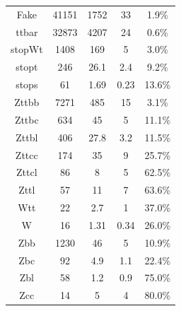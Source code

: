 \begin{table}
\begin{tabular}{|c|c|c|c|c|}
\hline
Fake             &            41151   &        1752                  &            33              &        1.9\%  \\
ttbar             &           32873   &         4207                  &            24              &        0.6\%  \\
stopWt             &           1408   &          169                  &            5              &        3.0\%  \\
stopt             &             246   &         26.1                  &            2.4              &        9.2\%  \\
stops             &              61   &         1.69                  &            0.23              &        13.6\%  \\
Zttbb             &            7271   &         485                  &            15              &        3.1\%  \\
Zttbc             &             634   &         45                  &            5              &        11.1\%  \\
Zttbl             &             406   &         27.8                  &            3.2              &        11.5\%  \\
Zttcc             &             174   &         35                  &            9              &        25.7\%  \\
Zttcl             &              86   &         8                  &            5              &        62.5\%  \\
Zttl             &               57   &        11                  &            7              &        63.6\%  \\
Wtt             &                22   &       2.7                  &            1              &        37.0\%  \\
W             &                  16   &     1.31                  &            0.34              &        26.0\%  \\
Zbb             &              1230   &       46                  &            5              &        10.9\%  \\
Zbc             &                92   &       4.9                  &            1.1              &        22.4\%  \\
Zbl             &                58   &       1.2                  &            0.9              &        75.0\%  \\
Zcc             &                14   &       5                  &            4              &        80.0\%  \\

\end{tabular}
\end{table}
